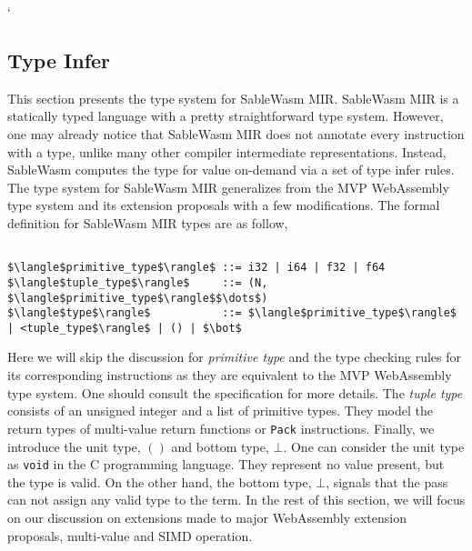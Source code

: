 `\subsection{Type Infer}

This section presents the type system for SableWasm MIR. SableWasm MIR is a statically typed language with a pretty straightforward type system. However, one may already notice that SableWasm MIR does not annotate every instruction with a type, unlike many other compiler intermediate representations. Instead, SableWasm computes the type for value on-demand via a set of type infer rules. The type system for SableWasm MIR generalizes from the MVP WebAssembly type system and its extension proposals with a few modifications. The formal definition for SableWasm MIR types are as follow,

\begin{lstlisting}[basicstyle=\linespread{1}\ttfamily, mathescape=true]

$\langle$primitive_type$\rangle$ ::= i32 | i64 | f32 | f64 
$\langle$tuple_type$\rangle$     ::= (N, $\langle$primitive_type$\rangle$$\dots$)
$\langle$type$\rangle$           ::= $\langle$primitive_type$\rangle$ | <tuple_type$\rangle$ | () | $\bot$

\end{lstlisting}

Here we will skip the discussion for \emph{primitive type} and the type checking rules for its corresponding instructions as they are equivalent to the MVP WebAssembly type system. One should consult the specification for more details. The \emph{tuple type} consists of an unsigned integer and a list of primitive types. They model the return types of multi-value return functions or \texttt{Pack} instructions. Finally, we introduce the unit type, $()$ and bottom type, $\bot$. One can consider the unit type as \texttt{void} in the C programming language. They represent no value present, but the type is valid. On the other hand, the bottom type, $\bot$, signals that the pass can not assign any valid type to the term. In the rest of this section, we will focus on our discussion on extensions made to major WebAssembly extension proposals, multi-value and SIMD operation.

